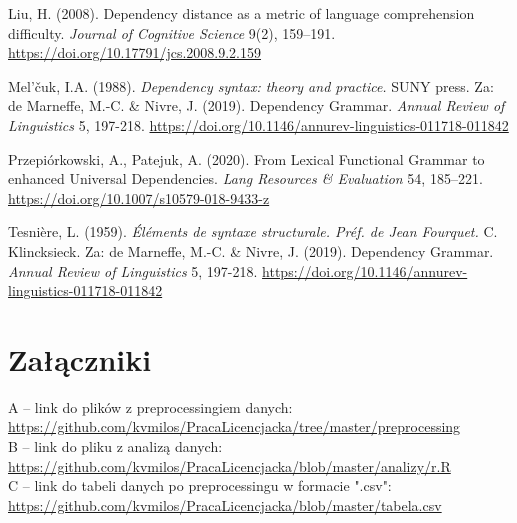 \documentclass[licencjacka]{pracamgr_Kogni}
\begin{document}
\begin{thebibliography}{99}
Liu, H. (2008). Dependency distance as a metric of language comprehension difficulty. \textit{Journal of Cognitive Science} 9(2), 159–191. \url{https://doi.org/10.17791/jcs.2008.9.2.159}

Mel'čuk, I.A. (1988). \textit{Dependency syntax: theory and practice.} SUNY press. Za: de Marneffe, M.-C. \& Nivre, J. (2019). Dependency Grammar. \textit{Annual Review of Linguistics} 5, 197-218. \url{https://doi.org/10.1146/annurev-linguistics-011718-011842}

Przepiórkowski, A., Patejuk, A. (2020). From Lexical Functional Grammar to enhanced Universal Dependencies. \textit{Lang Resources \& Evaluation} 54, 185–221. \url{https://doi.org/10.1007/s10579-018-9433-z}

Tesnière, L. (1959). \textit{Éléments de syntaxe structurale. Préf. de Jean Fourquet.} C. Klincksieck. Za: de Marneffe, M.-C. \& Nivre, J. (2019). Dependency Grammar. \textit{Annual Review of Linguistics} 5, 197-218. \url{https://doi.org/10.1146/annurev-linguistics-011718-011842}

\end{thebibliography}


\chapter*{Załączniki}

A -- link do plików z preprocessingiem danych: \url{https://github.com/kvmilos/PracaLicencjacka/tree/master/preprocessing} \\
B -- link do pliku z analizą danych: \url{https://github.com/kvmilos/PracaLicencjacka/blob/master/analizy/r.R} \\
C -- link do tabeli danych po preprocessingu w formacie ".csv": \url{https://github.com/kvmilos/PracaLicencjacka/blob/master/tabela.csv}
\end{document}
